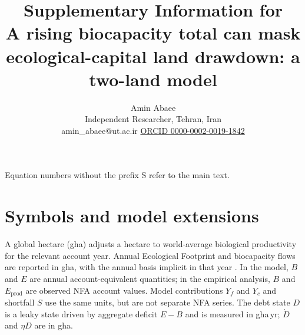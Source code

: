 \documentclass[11pt,a4paper]{article}
\title{Supplementary Information for\\[4pt]
\large A rising biocapacity total can mask ecological-capital land drawdown: a two-land model}
\author{Amin Abaee\\ \small Independent Researcher, Tehran, Iran\\ \small amin\_abaee@ut.ac.ir \quad\href{https://orcid.org/0000-0002-0019-1842}{ORCID 0000-0002-0019-1842}}
\begin{document}
\maketitle

\noindent Equation numbers without the prefix S refer to the main text.

\section{Symbols and model extensions}\label{si:symbols}

A global hectare (gha) adjusts a hectare to world-average biological productivity for the relevant account year. Annual Ecological Footprint and biocapacity flows are reported in gha, with the annual basis implicit in that year \citep{GFNStandards2009,GFNGuidebook2019}. In the model, $B$ and $E$ are annual account-equivalent quantities; in the empirical analysis, $B$ and $E_{\mathrm{prod}}$ are observed NFA account values. Model contributions $Y_f$ and $Y_c$ and shortfall $S$ use the same units, but are not separate NFA series. The debt state $D$ is a leaky state driven by aggregate deficit $E-B$ and is measured in gha\,yr; $\dot D$ and $\eta D$ are in gha.
\end{document}
